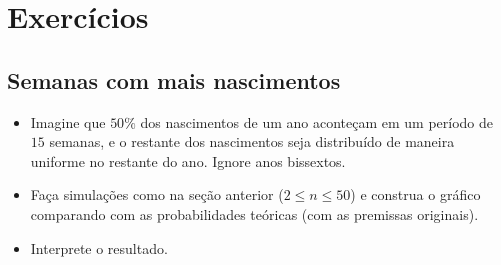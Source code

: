 \documentclass[
  11pt]{report}
\begin{document}
\hypertarget{exercuxedcios-13}{%
\section{Exercícios}\label{exercuxedcios-13}}

\hypertarget{semanas-com-mais-nascimentos}{%
\subsection{Semanas com mais nascimentos}\label{semanas-com-mais-nascimentos}}

\begin{itemize}
\item
  Imagine que $50\%$ dos nascimentos de um ano aconteçam em um período de $15$ semanas, e o restante dos nascimentos seja distribuído de maneira uniforme no restante do ano. Ignore anos bissextos.
\item
  Faça simulações como na seção anterior ($2 \leq n \leq 50$) e construa o gráfico comparando com as probabilidades teóricas (com as premissas originais).
\item
  Interprete o resultado.

\end{itemize}
\end{document}
